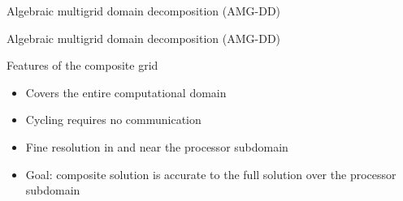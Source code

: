 \documentclass[18pt,xcolor=table]{beamer}
\begin{document}
\begin{frame}{Algebraic multigrid domain decomposition (AMG-DD)}
\end{frame}

\begin{frame}{Algebraic multigrid domain decomposition (AMG-DD)}
\begin{block}{Features of the composite grid}
\begin{itemize}
\item Covers the entire computational domain
\item Cycling requires no communication 
\item Fine resolution in and near the processor subdomain
\item Goal: composite solution is accurate to the full solution over the processor subdomain
\end{itemize}
\end{block}

\end{frame}
\end{document}
